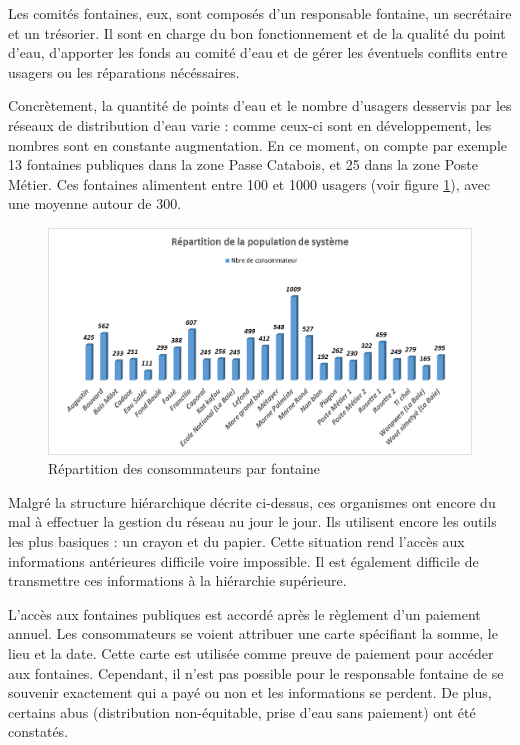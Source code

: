 \documentclass{EPL-master-thesis-covers-FR}
\begin{document}
				Les comités fontaines, eux, sont composés d'un responsable fontaine, un secrétaire et un trésorier. Il sont en charge du bon fonctionnement et de la qualité du point d'eau, d'apporter les fonds au comité d'eau et de gérer les éventuels conflits entre usagers ou les réparations nécéssaires.

				Concrètement, la quantité de points d'eau et le nombre d'usagers desservis par les réseaux de distribution d'eau varie : comme ceux-ci sont en développement, les nombres sont en constante augmentation. En ce moment, on compte par exemple 13 fontaines publiques dans la zone Passe Catabois, et 25 dans la zone Poste Métier. Ces fontaines alimentent entre 100 et 1000 usagers (voir figure \ref{fig:conso_fontaine}), avec une moyenne autour de 300.

				\begin{figure}[H]
					\includegraphics[width=\textwidth]{images/conso_fontaine}
					\caption{Répartition des consommateurs par fontaine}
					\label{fig:conso_fontaine}
				\end{figure}

				Malgré la structure hiérarchique décrite ci-dessus, ces organismes ont encore du mal à effectuer la gestion du réseau au jour le jour. Ils utilisent encore les outils les plus basiques : un crayon et du papier. Cette situation rend l'accès aux informations antérieures difficile voire impossible. Il est également difficile de transmettre ces informations à la hiérarchie supérieure.

				L'accès aux fontaines publiques est accordé après le règlement d'un paiement annuel. Les consommateurs se voient attribuer une carte spécifiant la somme, le lieu et la date. Cette carte est utilisée comme preuve de paiement pour accéder aux fontaines. Cependant, il n'est pas possible pour le responsable fontaine de se souvenir exactement qui a payé ou non et les informations se perdent. De plus, certains abus (distribution non-équitable, prise d'eau sans paiement) ont été constatés.
\end{document}
